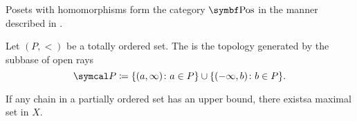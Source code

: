 \begin{definition}\label{def:category_of_posets}
  Posets with homomorphisms form the category \( \Cat{Pos} \) in the manner described in .
\end{definition}

\begin{definition}\label{def:order_topology}\cite{nLab:order_topology}
  Let \( (P, <) \) be a totally ordered set. The  is the topology generated by the subbase of open rays
  \begin{equation*}
    \Cal{P} \coloneqq \{ (a, \infty) \colon a \in P \} \cup \{ (-\infty, b) \colon b \in P \}.
  \end{equation*}
\end{definition}

\begin{lemma}\label{thm:zorns_lemma}\cite{nLab:zorns_lemma}
  If any chain in a partially ordered set has an upper bound, there exists\AOC a maximal set in \( X \).
\end{lemma}
